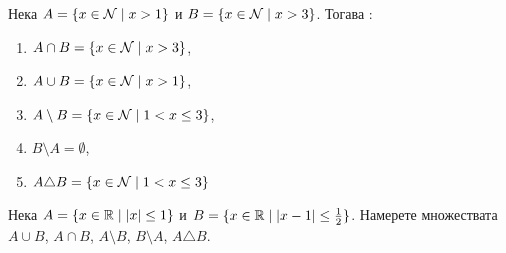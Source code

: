 
\begin{example}
  Нека $A = \{x\in\mathcal{N}\mid x > 1\}$ и $B = \{x\in\mathcal{N}\mid x>3\}$. Тогава :
    \begin{enumerate}[]
    \item
      $A\cap B = \{x\in\mathcal{N}\mid x > 3\}$,
    \item
      $A\cup B = \{x\in\mathcal{N}\mid x > 1\}$,
    \item
      $A\setminus B = \{x\in\mathcal{N}\mid 1<x\leq 3\}$,
    \item
      $B\setminus A = \emptyset$,
    \item
      $A\triangle B = \{x\in\mathcal{N}\mid 1<x\leq 3\}$
    \end{enumerate}
\end{example}


\begin{problem}
  Нека $A = \{x\in\mathbb{R}\mid |x|\leq 1\}$ и $B = \{x\in\mathbb{R}\mid |x-1|\leq \frac{1}{2}\}$.
  Намерете множествата $A\cup B$, $A\cap B$, $A\setminus B$, $B\setminus A$, $A\triangle B$.
\end{problem}



